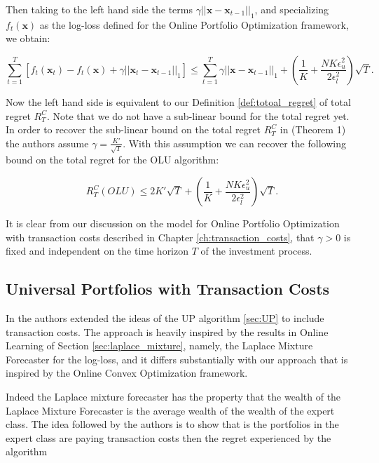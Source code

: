 Then taking to the left hand side the terms $\gamma||\mathbf x-\mathbf x_{t-1}||_1$, and specializing $f_t(\mathbf x)$ as the log-loss defined for the Online Portfolio Optimization framework, we obtain:

\begin{equation}
\sum\limits_{t=1}^T[f_t(\mathbf x_t)-f_t(\mathbf x)+\gamma||\mathbf x_t-\mathbf x_{t-1}||_1]\le \sum\limits_{t=1}^T\gamma||\mathbf x-\mathbf x_{t-1}||_1+\left( \frac{1}{K} + \frac{N K \epsilon_u^2 }{2 \epsilon_l^2} \right) \sqrt{T}.
\end{equation}

Now the left hand side is equivalent to our Definition \ref{def:totoal_regret} of total regret $R_T^C$. Note that we do not have a sub-linear bound for the total regret yet. In order to recover the sub-linear bound on the total regret $R_T^C$ in \cite{das2014online} (Theorem 1) the authors assume $\gamma=\frac{K'}{\sqrt{T}}$. With this assumption we can recover the following bound on the total regret for the OLU algorithm:

\begin{equation}
R_T^C(OLU)\le2K'\sqrt{T}+\left( \frac{1}{K} + \frac{N K \epsilon_u^2 }{2 \epsilon_l^2} \right) \sqrt{T}.
\end{equation}

It is clear from our discussion on the model for Online Portfolio Optimization with transaction costs described in Chapter \ref{ch:transaction_costs}, that $\gamma>0$ is fixed and independent on the time horizon $T$ of the investment process. 


\subsection{Universal Portfolios with Transaction Costs}

In \cite{blum1999universal} the authors extended the ideas of the UP algorithm \ref{sec:UP} to include transaction costs. The approach is heavily inspired by the results in Online Learning of Section \ref{sec:laplace_mixture}, namely, the Laplace Mixture Forecaster for the log-loss, and it differs substantially with our approach that is inspired by the Online Convex Optimization framework.

Indeed the Laplace mixture forecaster has the property \cite{cover1996universal} that the wealth of the Laplace Mixture Forecaster is the average wealth of the wealth of the expert class. The idea followed by the authors is to show that is the portfolios in the expert class are paying transaction costs then the regret experienced by the algorithm 


